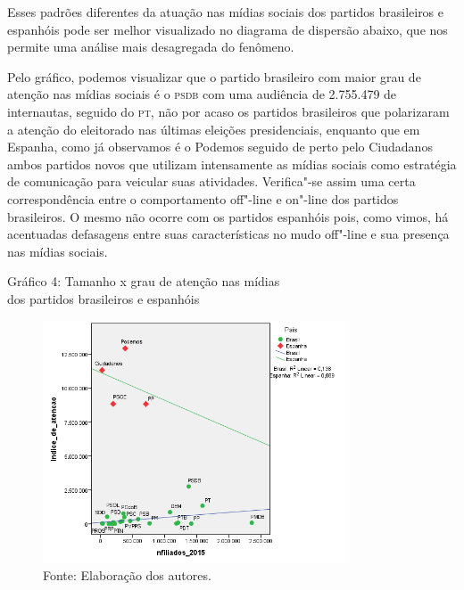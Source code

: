 Esses padrões diferentes da atuação nas mídias sociais dos partidos
brasileiros e espanhóis pode ser melhor visualizado no diagrama de
dispersão abaixo, que nos permite uma análise mais desagregada do
fenômeno.

Pelo gráfico, podemos visualizar que o partido brasileiro com maior grau
de atenção nas mídias sociais é o \textsc{psdb} com uma audiência de 2.755.479 de
internautas, seguido do \textsc{pt}, não por acaso os partidos brasileiros que
polarizaram a atenção do eleitorado nas últimas eleições presidenciais,
enquanto que em Espanha, como já observamos é o Podemos seguido de perto
pelo Ciudadanos ambos partidos novos que utilizam intensamente as mídias
sociais como estratégia de comunicação para veicular suas atividades.
Verifica"-se assim uma certa correspondência entre o comportamento
off"-line e on"-line dos partidos brasileiros. O mesmo não ocorre com os
partidos espanhóis pois, como vimos, há acentuadas defasagens entre suas
características no mudo off"-line e sua presença nas mídias sociais.

\begin{center}
Gráfico 4: Tamanho x grau de atenção nas mídias\\ dos partidos brasileiros
e espanhóis
\end{center}

\begin{figure}[!ht]
\centering
 \includegraphics[width=90mm]{./imgs/graf4.png}
\caption{Fonte: Elaboração dos autores.}
\end{figure}

